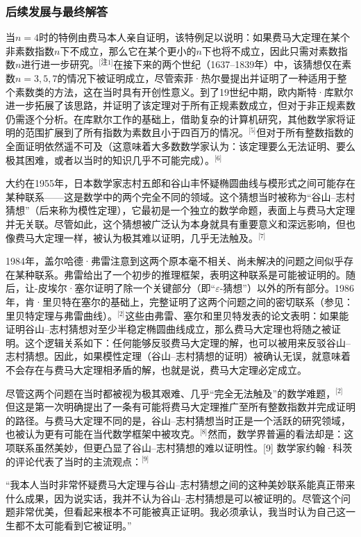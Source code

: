 \subsubsection{后续发展与最终解答}
当\(n = 4\)时的特例由费马本人亲自证明，该特例足以说明：如果费马大定理在某个非素数指数\(n\)下不成立，那么它在某个更小的\(n\)下也将不成立，因此只需对素数指数\(n\)进行进一步研究。\(^\text{[注1]}\)在接下来的两个世纪（1637–1839年）中，该猜想仅在素数\(n = 3, 5, 7\)的情况下被证明成立，尽管索菲·热尔曼提出并证明了一种适用于整个素数类的方法，这在当时具有开创性意义。到了19世纪中期，欧内斯特·库默尔进一步拓展了该思路，并证明了该定理对于所有正规素数成立，但对于非正规素数仍需逐个分析。在库默尔工作的基础上，借助复杂的计算机研究，其他数学家将证明的范围扩展到了所有指数为素数且小于四百万的情况。\(^\text{[5]}\)但对于所有整数指数的全面证明依然遥不可及（这意味着大多数数学家认为：该定理要么无法证明、要么极其困难，或者以当时的知识几乎不可能完成）。\(^\text{[6]}\)

大约在1955年，日本数学家志村五郎和谷山丰怀疑椭圆曲线与模形式之间可能存在某种联系——这是数学中的两个完全不同的领域。这个猜想当时被称为“谷山–志村猜想”（后来称为模性定理），它最初是一个独立的数学命题，表面上与费马大定理并无关联。尽管如此，这个猜想被广泛认为本身就具有重要意义和深远影响，但也像费马大定理一样，被认为极其难以证明，几乎无法触及。\(^\text{[7]}\)

1984年，盖尔哈德·弗雷注意到这两个原本毫不相关、尚未解决的问题之间似乎存在某种联系。弗雷给出了一个初步的推理框架，表明这种联系是可能被证明的。随后，让-皮埃尔·塞尔证明了除一个关键部分（即“\(\varepsilon\)-猜想”）以外的所有部分。1986年，肯·里贝特在塞尔的基础上，完整证明了这两个问题之间的密切联系（参见：里贝特定理与弗雷曲线）。\(^\text{[2]}\)这些由弗雷、塞尔和里贝特发表的论文表明：如果能证明谷山–志村猜想对至少半稳定椭圆曲线成立，那么费马大定理也将随之被证明。这个逻辑关系如下：任何能够反驳费马大定理的解，也可以被用来反驳谷山–志村猜想。因此，如果模性定理（谷山–志村猜想的证明）被确认无误，就意味着不会存在与费马大定理相矛盾的解，也就是说，费马大定理必定成立。

尽管这两个问题在当时都被视为极其艰难、几乎“完全无法触及”的数学难题，\(^\text{[2]}\) 但这是第一次明确提出了一条有可能将费马大定理推广至所有整数指数并完成证明的路径。与费马大定理不同的是，谷山–志村猜想当时正是一个活跃的研究领域，也被认为更有可能在当代数学框架中被攻克。\(^\text{[8]}\)然而，数学界普遍的看法却是：这项联系虽然美妙，但更凸显了谷山–志村猜想的难以证明性。[9] 数学家约翰·科茨的评论代表了当时的主流观点：\(^\text{[9]}\)

“我本人当时非常怀疑费马大定理与谷山–志村猜想之间的这种美妙联系能真正带来什么成果，因为说实话，我并不认为谷山–志村猜想是可以被证明的。尽管这个问题非常优美，但看起来根本不可能被真正证明。我必须承认，我当时认为自己这一生都不太可能看到它被证明。”

